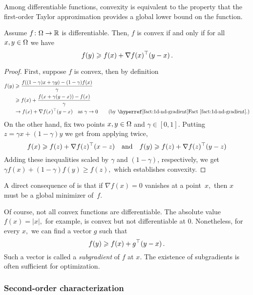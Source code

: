 Among differentiable functions, convexity is equivalent to the property that the first-order Taylor approximation provides a global lower bound on the function.

\begin{proposition}
Assume $f\colon\Omega\to\mathbb{R}$ is differentiable. Then, $f$ is convex if and only if for all $x,y\in\Omega$ we have
\begin{equation}\equationlabel{first-order-lower-bound}
f(y) \ge f(x) + \nabla f(x)^\trans (y-x)\,.
\end{equation}
\end{proposition}
\begin{proof}
First, suppose $f$ is convex, then by definition
\begin{align*}
f(y) &\ge \frac{f((1-\gamma)x+\gamma y)-(1-\gamma)f(x)}{\gamma}\\
&\ge f(x) +\frac{f(x+\gamma(y-x))-f(x)}\gamma\\
&\rightarrow f(x) +\nabla f(x)^\trans (y-x) \quad\text{as $\gamma\to 0$} \tag{by \factref{1d-nd-gradient}.}
\end{align*}
On the other hand, fix two points $x, y\in\Omega$ and $\gamma\in[0,1]$. Putting $z=\gamma x + (1-\gamma)y$ we get from applying  twice,
\[
f(x) \geqslant f(z) + \nabla f(z)^\top (x-z)
\quad\text{and}\quad
f(y) \geqslant f(z) + \nabla f(z)^\top (y-z)
\]
Adding these inequalities scaled by $\gamma$ and $(1-\gamma)$, respectively, we get $\gamma f(x)+(1-\gamma)f(y)\ge f(z),$ which establishes convexity.
\end{proof}

A direct consequence of  is that
if $\nabla f(x)=0$ vanishes at a point~$x,$ then $x$ must be a global minimizer
of~$f.$

\begin{remark}[Subgradients]
Of course, not all convex functions are differentiable. The absolute
value~$f(x)=|x|,$ for example, is convex but not differentiable at $0.$
Nonetheless, for every $x,$ we can find a vector $g$ such that
\[
f(y) \geqslant f(x) + g^\top (y-x)\,.
\]
Such a vector is called a \emph{subgradient} of $f$ at $x.$ The existence of
subgradients is often sufficient for optimization.
\end{remark}

\subsubsection{Second-order characterization}

